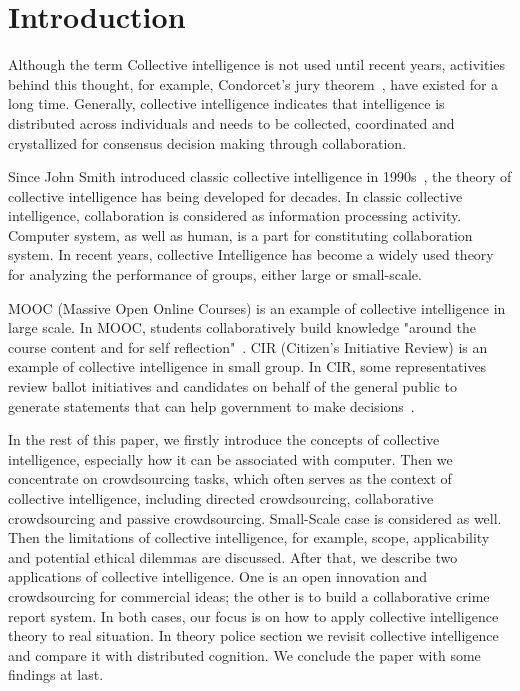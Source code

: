 \section{Introduction}

Although the term Collective intelligence is not used until recent years, activities behind this thought, for example, Condorcet's jury theorem~\cite{ landemore2012democratic}, have existed for a long time. Generally, collective intelligence indicates that intelligence is distributed across individuals and needs to be collected, coordinated and crystallized for consensus decision making through collaboration.

Since John Smith introduced classic collective intelligence in 1990s~\cite{cibook}, the theory of collective intelligence has being developed for decades. In classic collective intelligence, collaboration is considered as information processing activity. Computer system, as well as human, is a part for constituting collaboration system. In recent years, collective Intelligence has become a widely used theory for analyzing the performance of groups, either large or small-scale. 

MOOC (Massive Open Online Courses) is an example of collective intelligence in large scale. In MOOC, students collaboratively build knowledge "around the course content and for self reflection"~\cite{de2012merging}.
CIR (Citizen's Initiative Review) is an example of collective intelligence in small group. In CIR, some representatives review ballot initiatives and
candidates on behalf of the general public to generate statements that can help government to make decisions~\cite{atlee2008co}.

In the rest of this paper, we firstly introduce the concepts of collective intelligence, especially how it can be associated with computer. Then we concentrate on crowdsourcing tasks, which often serves as the context of collective intelligence, including directed crowdsourcing, collaborative crowdsourcing and passive crowdsourcing. Small-Scale case is considered as well. Then the limitations of collective intelligence, for example, scope, applicability and potential ethical dilemmas are discussed. After that, we describe two applications of collective intelligence. One is an open innovation and crowdsourcing for commercial ideas; the other is to build a collaborative crime report system. In both cases, our focus is on how to apply collective intelligence theory to real situation. In theory police section we revisit collective intelligence and compare it with distributed cognition. We conclude the paper with some findings at last.
